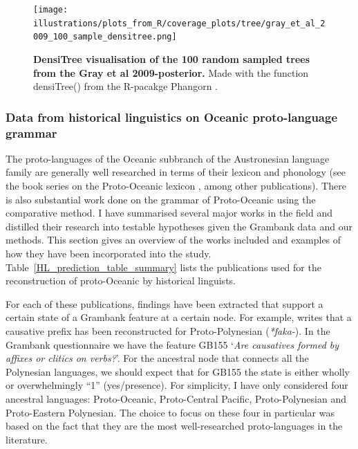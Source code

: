 \documentclass[a4paper,10pt]{article} %
\begin{document}
\begin{figure}[H]
\centering
\texttt{[image: illustrations/plots\_from\_R/coverage\_plots/tree/gray\_et\_al\_2009\_100\_sample\_densitree.png]}
\caption{\textbf{DensiTree \citep{bouckaert2014densitree} visualisation of the 100 random sampled trees from the Gray et al 2009-posterior.} Made with the function densiTree() from the R-pacakge Phangorn \citep{phangorn}.}
\label{densitree_plot}
\end{figure}

\subsubsection{Data from historical linguistics on Oceanic proto-language grammar}
\label{sec:POC_lit_review}


The proto-languages of the Oceanic subbranch of the Austronesian language family are generally well researched in terms of their lexicon and phonology (see the book series on the Proto-Oceanic lexicon \citep{protooceanicvol1, protooceanicvol2, protooceanicvol3, protooceanicvol4, protooceanicvol5}, among other publications). There is also substantial work done on the grammar of Proto-Oceanic using the comparative method. I have summarised several major works in the field and distilled their research into testable hypotheses given the Grambank data and our methods. This section gives an overview of the works included and examples of how they have been incorporated into the study. Table~\ref{HL_prediction_table_summary} lists the publications used for the reconstruction of proto-Oceanic by historical linguists. 

For each of these publications, findings have been extracted that support a certain state of a Grambank feature at a certain node. For example, \citet[4]{marck2000_encyclo} writes that a causative prefix has been reconstructed for Proto-Polynesian (\emph{*faka-}). In the Grambank questionnaire we have the feature GB155 `\emph{Are causatives formed by affixes or clitics on verbs?}'. For the ancestral node that connects all the Polynesian languages, we should expect that for GB155 the state is either wholly or overwhelmingly ``1'' (yes/presence). For simplicity, I have only considered four ancestral languages: Proto-Oceanic, Proto-Central Pacific, Proto-Polynesian and Proto-Eastern Polynesian. The choice to focus on these four in particular was based on the fact that they are the most well-researched proto-languages in the literature. 
\end{document}
